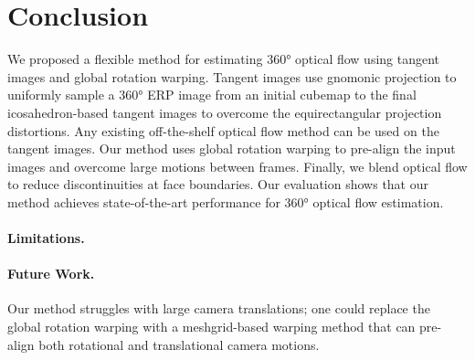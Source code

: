 \section{Conclusion}

We proposed a flexible method for estimating 360° optical flow using tangent images and global rotation warping.
%
Tangent images use gnomonic projection to uniformly sample a 360° ERP image from an initial cubemap to the final icosahedron-based tangent images to overcome the equirectangular projection distortions.
Any existing off-the-shelf optical flow method can be used on the tangent images.
%
Our method uses global rotation warping to pre-align the input images and overcome large motions between frames.
Finally, we blend optical flow to reduce discontinuities at face boundaries.
%
Our evaluation shows that our method achieves state-of-the-art performance for 360° optical flow estimation.



\paragraph{Limitations.}


\paragraph{Future Work.}
%
Our method struggles with large camera translations; one could replace the global rotation warping with a meshgrid-based warping method that can pre-align both rotational and translational camera motions.


